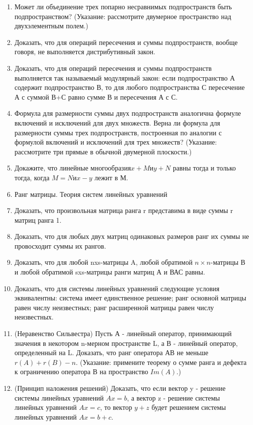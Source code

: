 \documentclass[a4paper]{article}
\begin{document}
\begin{enumerate}
\item Может ли объединение трех попарно несравнимых подпространств быть подпространством? (Указание: рассмотрите двумерное пространство над двухэлементным полем.)
\item Доказать, что для операций пересечения и суммы подпространств, вообще говоря, не выполняется дистрибутивный закон.
\item Доказать, что для операций пересечения и суммы подпространств выполняется так называемый модулярный закон: если подпространство А содержит подпространство В, то для любого подпространства С пересечение А с суммой В+С равно сумме В и пересечения А с С.
\item Формула для размерности суммы двух подпространств аналогична формуле включений и исключений для двух множеств. Верна ли формула для размерности суммы трех подпространств, построенная по аналогии с формулой включений и исключений для трех множеств? (Указание: рассмотрите три прямые в обычной двумерной плоскости.)
\item Докажите, что линейные многообразия$ x+M и y+N$ равны тогда и только тогда, когда $M = N и x-y$ лежит в М.
\item Ранг матрицы. Теория систем линейных уравнений
\item Доказать, что произвольная матрица ранга r представима в виде суммы r матриц ранга 1.
\item Доказать, что для любых двух матриц одинаковых размеров ранг их суммы не провосходит суммы их рангов.
\item Доказать, что для любой nxs-матрицы A, любой обратимой $n \times n$-матрицы В и любой обратимой sxs-матрицы ранги матриц А и ВАС равны.
\item Доказать, что для системы линейных уравнений следующие условия эквивалентны:
система имеет единственное решение;
ранг основной матрицы равен числу неизвестных;
ранг расширенной матрицы равен числу неизвестных.
\item (Неравенство Сильвестра) Пусть А - линейный оператор, принимающий значения в некотором n-мерном пространстве L, а В - линейный оператор, определенный на L. Доказать, что ранг оператора АВ не меньше $r(A)+r(B)-n$. (Указание: примените теорему о сумме ранга и дефекта к ограничению оператора В на пространство $Im(A)$.)
\item (Принцип наложения решений) Доказать, что если вектор y - решение системы линейных уравнений $Ax=b$, а вектор z - решение системы линейных уравнений $Ax=c$, то вектор $y+z$ будет решением системы линейных уравнений $Ax=b+c$.

\end{enumerate}
\end{document}
